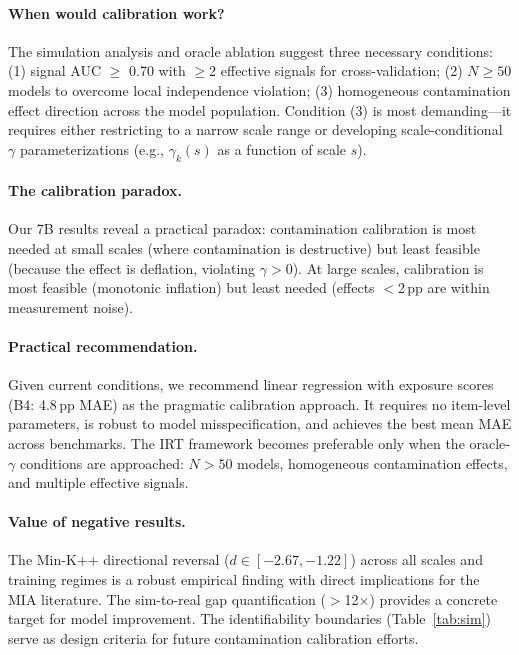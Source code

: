 \documentclass[11pt,a4paper]{article}
\begin{document}
\paragraph{When would calibration work?}
The simulation analysis and oracle ablation suggest three necessary conditions: (1) signal AUC $\geq$ 0.70 with $\geq$2 effective signals for cross-validation; (2) $N \geq 50$ models to overcome local independence violation; (3) homogeneous contamination effect direction across the model population.
Condition (3) is most demanding---it requires either restricting to a narrow scale range or developing scale-conditional $\gamma$ parameterizations (e.g., $\gamma_k(s)$ as a function of scale $s$).

\paragraph{The calibration paradox.}
Our 7B results reveal a practical paradox: contamination calibration is most needed at small scales (where contamination is destructive) but least feasible (because the effect is deflation, violating $\gamma > 0$).
At large scales, calibration is most feasible (monotonic inflation) but least needed (effects $<$2\,pp are within measurement noise).

\paragraph{Practical recommendation.}
Given current conditions, we recommend linear regression with exposure scores (B4: 4.8\,pp MAE) as the pragmatic calibration approach.
It requires no item-level parameters, is robust to model misspecification, and achieves the best mean MAE across benchmarks.
The IRT framework becomes preferable only when the oracle-$\gamma$ conditions are approached: $N > 50$ models, homogeneous contamination effects, and multiple effective signals.

\paragraph{Value of negative results.}
The Min-K++ directional reversal ($d \in [-2.67, -1.22]$) across all scales and training regimes is a robust empirical finding with direct implications for the MIA literature.
The sim-to-real gap quantification ($>$12$\times$) provides a concrete target for model improvement.
The identifiability boundaries (Table~\ref{tab:sim}) serve as design criteria for future contamination calibration efforts.
\end{document}

